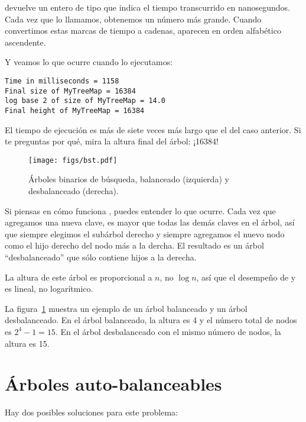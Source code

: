 \documentclass[12pt]{book}
\theoremstyle{exercise}
\begin{document}
 devuelve un entero de tipo  que
indica el tiempo transcurrido en nanosegundos. Cada vez que lo llamamos,
obtenemos un número más grande. Cuando convertimos estas marcas de
tiempo a cadenas, aparecen en orden alfabético ascendente.

Y veamos lo que ocurre cuando lo ejecutamos:

\begin{verbatim}
Time in milliseconds = 1158
Final size of MyTreeMap = 16384
log base 2 of size of MyTreeMap = 14.0
Final height of MyTreeMap = 16384
\end{verbatim}

El tiempo de ejecución es más de siete veces más largo que el del caso
anterior. Si te preguntas por qué, mira la altura final del árbol: ¡16384!

\begin{figure}
\centering
\texttt{[image: figs/bst.pdf]}
\caption{Árboles binarios de búsqueda, balanceado (izquierda) y desbalanceado (derecha).}
\label{bstfig}
\end{figure}

Si piensas en cómo funciona , puedes entender lo que ocurre.
Cada vez que agregamos una nueva clave, es mayor que todas las demás
claves en el árbol, así que siempre elegimos el subárbol derecho y siempre
agregamos el nuevo nodo como el hijo derecho del nodo más a la dercha. El
resultado es un árbol ``desbalanceado'' que sólo contiene hijos a la derecha.


La altura de este árbol es proporcional a $n$, no
$\log n$, así que el desempeño de  y  es
lineal, no logarítmico.


La figura~\ref{bstfig} muestra un ejemplo de un árbol balanceado y un
árbol desbalanceado. En el árbol balanceado, la altura es 4 y el número
total de nodos es $2^4-1 = 15$.  En el árbol desbalanceado con el mismo
número de nodos, la altura es 15.


\section{Árboles auto-balanceables}
\label{self-balancing-trees}


Hay dos posibles soluciones para este problema:
\end{document}
